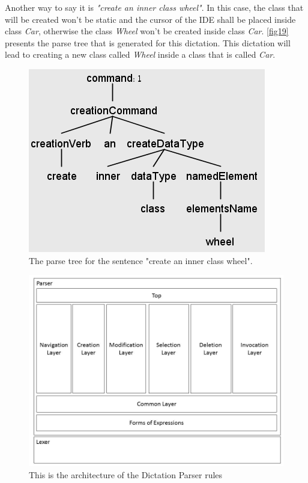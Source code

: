 Another way to say it is \textit{"create an inner class wheel"}. In this case, the class that will be created won't be static and the cursor of the IDE shall be placed inside class \textit{Car}, otherwise the class \textit{Wheel} won't be created inside class \textit{Car}. \autoref{fig19} presents the parse tree that is generated for this dictation. This dictation will lead to creating a new class called \textit{Wheel} inside a class that is called \textit{Car}.

\begin{figure}[H]
	\centering
	\includegraphics[scale=0.4]{"./fig/Parse Tree create an inner class wheel"}
	\caption{The parse tree for the sentence "create an inner class wheel".}
	\label{fig19}
\end{figure}

\begin{figure}[H]
	\centering
	\includegraphics[scale=0.4]{./fig/BNFDiagram}
	\caption{This is the architecture of the Dictation Parser rules}
	\label{fig21}
\end{figure}

